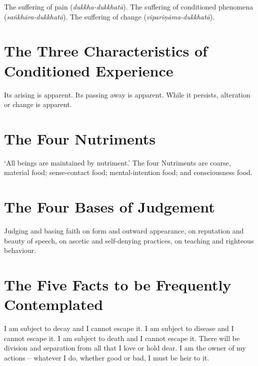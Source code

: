 The suffering of pain (\emph{dukkha-dukkhatā}).
The suffering of conditioned phenomena (\emph{saṅkhāra-dukkhatā}).
The suffering of change (\emph{vipariṇāma-dukkhatā}).


\ifhandbookedition
\vspace*{-\baselineskip}
\fi

\section*{The Three Characteristics of Conditioned Experience}

Its arising is apparent. Its passing away is apparent. While it persists,
alteration or change is apparent.


\ifhandbookedition
\vspace*{-1.1\baselineskip}
\enlargethispage{\baselineskip}
\fi

\section*{The Four Nutriments}

‘All beings are maintained by nutriment.’ The four Nutriments are coarse,
material food; sense-contact food; mental-intention food; and consciousness
food.


\ifhandbookedition
\vspace*{-1.1\baselineskip}
\fi

\section*{The Four Bases of Judgement}

Judging and basing faith on form and outward appearance, on reputation and
beauty of speech, on ascetic and self-denying practices, on teaching and
righteous behaviour.


\ifhandbookedition
\vspace*{-1.1\baselineskip}
\fi

\section*{The Five Facts to be Frequently Contemplated}

I am subject to decay and I cannot escape it. I am subject to disease and I
cannot escape it. I am subject to death and I cannot escape it. There will be
division and separation from all that I love or hold dear. I am the owner of my
actions -- whatever I do, whether good or bad, I must be heir to it.

